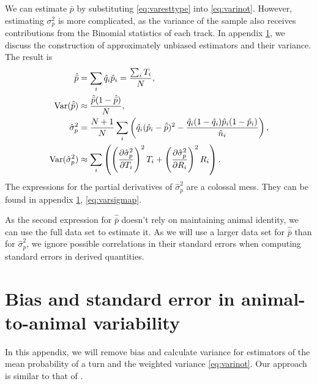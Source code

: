 \documentclass[12pt]{article}
\newcommand{\pdiffc}[3][\rule{0mm}{0mm}]{\left (\frac{\partial #2}{\partial {#3}}\right )_{\!\!#1}}
\DeclareMathOperator{\var}{Var}
\newcommand{\prn}[1]{\left ( #1 \right )}
\begin{document}
We can estimate $\bar{p}$ by substituting \eqref{eq:varesttype} into \eqref{eq:varinot}. However, estimating $\sigma_p^2$ is more complicated, as the variance of the sample also receives contributions from the Binomial statistics of each track. In appendix \ref{sec:varibias}, we discuss the construction of approximately unbiased estimators and their variance. The result is
%
\begin{equation}\label{eq:variests}
  \begin{aligned}
    \hat{\bar{p}} &= \sum_i \hat{q}_i \hat{p}_i
        = \frac{\sum_i T_i}{N},\\
    \var(\hat{\bar{p}}) &\approx \frac{\hat{\bar{p}}(1-\hat{\bar{p}})}{N},\\
    \hat{\sigma}_p^2 &= \frac{N+1}{N} \sum_i\prn{ \hat{q}_i(\hat{p}_i-\hat{\bar{p}})^2 - \frac{\hat{q}_i(1-\hat{q}_i)\hat{p}_i(1-\hat{p}_i)}{\hat{n}_i}},\\
    \var(\hat{\sigma}_p^2) &\approx \sum_i\prn{ \pdiffc{\hat{\sigma}_p^2}{T_i}^2 T_i + \pdiffc{\hat{\sigma}_p^2}{R_i}^2 R_i }.
  \end{aligned}
\end{equation}
%
The expressions for the partial derivatives of $\hat{\sigma}_p^2$ are a colossal mess. They can be found in appendix \ref{sec:varibias}, \eqref{eq:varsigmap}.

As the second expression for $\hat{\bar{p}}$ doesn't rely on maintaining animal identity, we can use the full data set to estimate it. As we will use a larger data set for $\hat{\bar{p}}$ than for $\hat{\sigma}_p^2$, we ignore possible correlations in their standard errors when computing standard errors in derived quantities.

\appendix

\section{Bias and standard error in animal-to-animal variability}\label{sec:varibias}

In this appendix, we will remove bias and calculate variance for estimators of the mean probability of a turn and the weighted variance \eqref{eq:varinot}. Our approach is similar to that of \cite{Roulston1999}.
\end{document}
